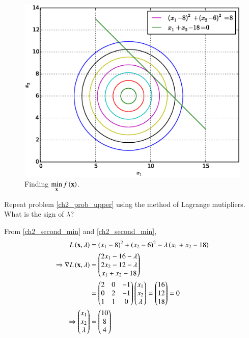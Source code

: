 \documentclass[journal,12pt,twocolumn]{IEEEtran}
\begin{document}
%
\begin{figure}[h]
\centering
\includegraphics[width=\columnwidth]{./figs/2.8.eps}
\caption{ Finding $ \displaystyle \min_{\mathbf{x}}f\left(\mathbf{x}\right)$.}
\label{fig.2.8}	
\end{figure}
%
\begin{problem}
Repeat problem \ref{ch2_prob_upper} using the method of Lagrange mutipliers.  What is the sign of $\lambda$?
\end{problem}
%
\solution
From \eqref{ch2_second_min} and \eqref{ch2_second_min}, 
%
\begin{align}
L\left(\mathbf{x},\lambda\right) &= (x_1-8)^2 + (x_2-6)^2 - \lambda \left(x_1 + x_2 - 18\right) \\
\Rightarrow \nabla L\left(\mathbf{x},\lambda\right)  & = 
\begin{pmatrix}
2x_1  - 16 - \lambda \\
2x_2 - 12 - \lambda \\
x_1 + x_2 -18
\end{pmatrix}
\\
&=
\begin{pmatrix}
2 &0 & - 1 \\
0 &2 & - 1 \\
1 & 1 & 0 
\end{pmatrix}
\begin{pmatrix}
x_1 \\
x_2 \\
\lambda
\end{pmatrix}
= 
\begin{pmatrix}
16 \\
 12 \\
18
\end{pmatrix}
=
0 
\\
\Rightarrow 
\begin{pmatrix}
x_1 \\
x_2 \\
\lambda
\end{pmatrix}
&= 
\begin{pmatrix}
10 \\
 8 \\
4
\end{pmatrix}
\end{align}
\end{document}
